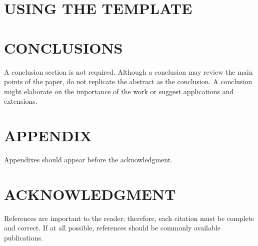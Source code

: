 \documentclass[letterpaper, 10 pt, conference]{ieeeconf}  %
\begin{document}
\section{USING THE TEMPLATE}
\label{result}

\section{CONCLUSIONS}
\label{conclusions}
A conclusion section is not required. Although a conclusion may review the main points of the paper, do not replicate the abstract as the conclusion. A conclusion might elaborate on the importance of the work or suggest applications and extensions.

\addtolength{\textheight}{-12cm}   %







\section*{APPENDIX}

Appendixes should appear before the acknowledgment.

\section*{ACKNOWLEDGMENT}


References are important to the reader; therefore, each citation must be complete and correct. If at all possible, references should be commonly available publications.



\end{document}
